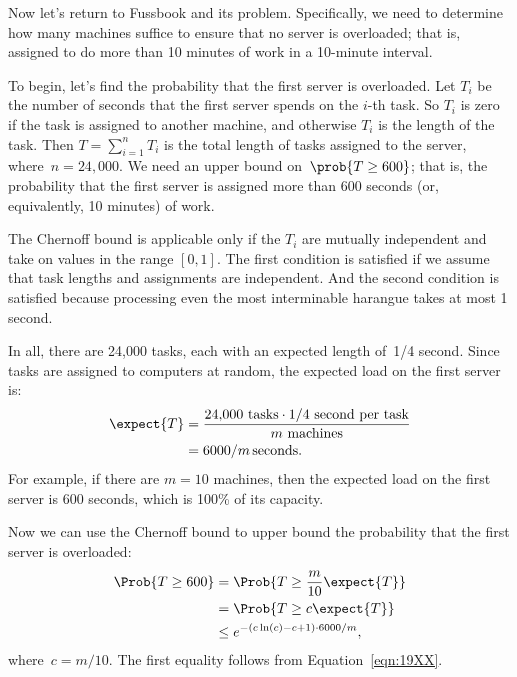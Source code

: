 Now let's return to Fussbook and its  problem.
Specifically, we need to determine how many machines suffice to ensure
that no server is overloaded; that is, assigned to do more than 10
minutes of work in a 10-minute interval.

To begin, let's find the probability that the first server is
overloaded.  Let $T_i$ be the number of seconds that the first server
spends on the $i$-th task.  So $T_i$ is zero if the task is assigned
to another machine, and otherwise $T_i$ is the length of the task.
Then $T = \sum_{i = 1}^n T_i$ is the total length of tasks assigned to
the server, where~$n = 24{,}000$.  We need an upper bound on~$\prob{T
  \geq 600}$; that is, the probability that the first server is
assigned more than 600 seconds (or, equivalently, 10 minutes) of work.

The Chernoff bound is applicable only if the $T_i$ are mutually
independent and take on values in the range $[0, 1]$.  The first
condition is satisfied if we assume that task lengths and assignments
are independent.  And the second condition is satisfied because
processing even the most interminable harangue takes at most 1 second.

In all, there are 24,000 tasks, each with an expected length of~1/4
second.  Since tasks are assigned to computers at random, the expected
load on the first server is:
\begin{align}
\expect{T} & = \frac{24{,}000 \mbox{ tasks} \cdot 1/4 \mbox{ second per task}}
  {m \mbox{ machines}} \notag\\
  & = 6000 / m\,\text{seconds}.
\label{eqn:19XX}
\end{align}
For example, if there are $m = 10$ machines, then the expected load on
the first server is 600 seconds, which is 100\% of its capacity.

Now we can use the Chernoff bound to upper bound the probability that
the first server is overloaded:
\begin{align*}
\Prob{T \geq 600}
    &= \Prob{ T \ge \frac{m}{10} \expect{T} } \\
    &= \Prob{T \geq c \expect{T}} \\
    &\leq e^{-(c \ln(c) - c + 1) \cdot 6000 / m},
\end{align*}
where~$c = m/10$. The first equality follows from
Equation~\ref{eqn:19XX}.

